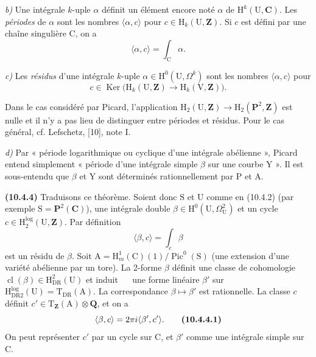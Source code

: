 \documentclass[11pt,leqno]{article}
\newcommand{\Page}[1]{\ifvmode\noindent\else\unskip\ \fi{\footnotesize\textcolor{gray}{[p.\,#1]}}\ \ignorespaces}
\begin{document}
\textit{b)} Une intégrale \(k\)-uple \(\alpha\) définit un élément encore noté \(\alpha\) de \(\mathrm{H}^{k}(\mathrm{U},\mathbf{C})\). Les \textit{périodes} de \(\alpha\) sont les nombres \(\langle\alpha,c\rangle\) pour \(c\in\mathrm{H}_{k}(\mathrm{U},\mathbf{Z})\). Si \(c\) est défini par une chaîne singulière \(\mathrm{C}\), on a
\[
\langle\alpha,c\rangle=\int_{\mathrm{C}}\alpha.
\]

\textit{c)} Les \textit{résidus} d’une intégrale \(k\)-uple \(\alpha\in\mathrm{H}^{0}(\mathrm{U},\Omega^{k})\) sont les nombres \(\langle\alpha,c\rangle\) pour
\[
c\in\operatorname{Ker}\bigl(
\mathrm{H}_{k}(\mathrm{U},\mathbf{Z})
\to\mathrm{H}_{k}(\mathrm{V},\mathbf{Z})\bigr).
\]

Dans le cas considéré par Picard, l’application \(\mathrm{H}_{2}(\mathrm{U},\mathbf{Z})\to\mathrm{H}_{2}(\mathbf{P}^{2},\mathbf{Z})\) est nulle et il n’y a pas lieu de distinguer entre périodes et résidus. Pour le cas général, cf. Lefschetz, [10], note I.

\textit{d)} Par « période logarithmique ou cyclique d’une intégrale abélienne », Picard entend simplement « période d’une intégrale simple \(\beta\) sur une courbe \(\mathrm{Y}\) ». Il est sous-entendu que \(\beta\) et \(\mathrm{Y}\) sont déterminés rationnellement par \(\mathrm{P}\) et \(\mathrm{A}\).

\textbf{(10.4.4)} Traduisons ce théorème. Soient donc \(\mathrm{S}\) et \(\mathrm{U}\) comme en (10.4.2) (par exemple \(\mathrm{S}=\mathbf{P}^{2}(\mathbf{C})\)), une intégrale double \(\beta\in\mathrm{H}^{0}(\mathrm{U},\Omega^{2}_{\mathrm{U}})\) et un cycle \(c\in\mathrm{H}^{\log}_{2}(\mathrm{U},\mathbf{Z})\). Par définition
\[
\langle\beta,c\rangle=\int_c\beta
\]
est un résidu de \(\beta\). Soit \(\mathrm{A}=\mathrm{H}^{1}_{m}(\mathrm{C})(1)/\operatorname{Pic}^{0}(\mathrm{S})\) (une extension d’une variété abélienne par un tore). La 2-forme \(\beta\) définit une classe de cohomologie \(\operatorname{cl}(\beta)\in\mathrm{H}^{2}_{\mathrm{DR}}(\mathrm{U})\) et induit
\Page{77}
une forme linéaire \(\beta'\) sur \(\mathrm{H}^{\log}_{\mathrm{DR}2}(\mathrm{U})=\mathrm{T}_{\mathrm{DR}}(\mathrm{A})\). La correspondance \(\beta\mapsto\beta'\) est rationnelle. La classe \(c\) définit \(c'\in\mathrm{T}_{\mathbf{Z}}(\mathrm{A})\otimes\mathbf{Q}\), et on a
\[
\langle\beta,c\rangle=2\pi i\langle\beta',c'\rangle.
\tag*{\textbf{(10.4.4.1)}}
\]
On peut représenter \(c'\) par un cycle sur \(\mathrm{C}\), et \(\beta'\) comme une intégrale simple sur \(\mathrm{C}\).
\end{document}
